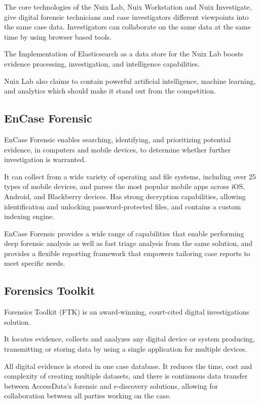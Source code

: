 The core technologies of the Nuix Lab, Nuix Workstation and Nuix Investigate, give digital forensic technicians and case investigators 
different viewpoints into the same case data. Investigators can collaborate on 
the same data at the same time by using browser based tools.

The Implementation of Elasticsearch \cite{elasticsearch} as a data store for the Nuix Lab boosts evidence processing, investigation, and intelligence capabilities. 

Nuix Lab also claims to contain powerful artificial intelligence, machine learning, and analytics which should make it stand out from the competition. 

\subsection{EnCase Forensic}

EnCase Forensic \cite{encase} enables searching, identifying, and prioritizing potential evidence, in computers and mobile devices, to determine whether 
further investigation is warranted.

It can collect from a wide variety of operating and file systems, including over 25 types of mobile devices, and parses the most popular mobile apps across iOS, Android, and Blackberry devices.
Has strong decryption capabilities, allowing identification and unlocking password-protected files, and contains a custom indexing engine.

EnCase Forensic provides a wide range of capabilities that enable performing deep forensic analysis as well as fast triage analysis from the same solution, and provides a flexible
reporting framework that empowers tailoring case reports to meet specific needs.

\subsection{Forensics Toolkit}

Forensics Toolkit (FTK) \cite{ftk} is an award-winning, court-cited digital investigations solution. 

It locates evidence, collects and analyzes any digital device or system producing, transmitting or 
storing data by using a single application for multiple devices.

All digital evidence is stored in one case database. It reduces the time, cost and complexity of creating multiple datasets, and there is continuous data transfer between AccessData's forensic 
and e-discovery solutions, allowing for collaboration between all parties working on the case. 

